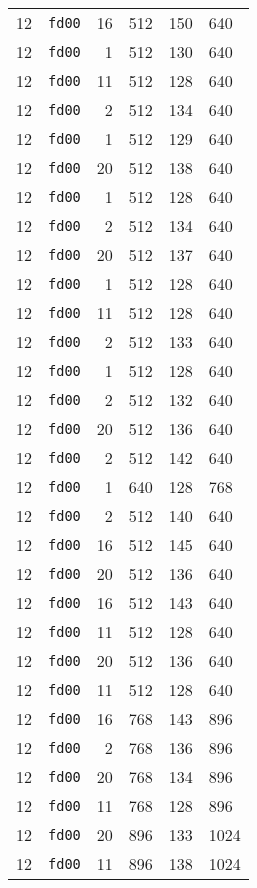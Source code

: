 \documentclass{article}
\begin{document}
\begin{table}[h!]
\begin{tabular}{llrrrl}
    12 & \texttt{fd00} & 16 & 512 & 150 & 640 \\
    12 & \texttt{fd00} & 1 & 512 & 130 & 640 \\
    12 & \texttt{fd00} & 11 & 512 & 128 & 640 \\
    12 & \texttt{fd00} & 2 & 512 & 134 & 640 \\
    12 & \texttt{fd00} & 1 & 512 & 129 & 640 \\
    12 & \texttt{fd00} & 20 & 512 & 138 & 640 \\
    12 & \texttt{fd00} & 1 & 512 & 128 & 640 \\
    12 & \texttt{fd00} & 2 & 512 & 134 & 640 \\
    12 & \texttt{fd00} & 20 & 512 & 137 & 640 \\
    12 & \texttt{fd00} & 1 & 512 & 128 & 640 \\
    12 & \texttt{fd00} & 11 & 512 & 128 & 640 \\
    12 & \texttt{fd00} & 2 & 512 & 133 & 640 \\
    12 & \texttt{fd00} & 1 & 512 & 128 & 640 \\
    12 & \texttt{fd00} & 2 & 512 & 132 & 640 \\
    12 & \texttt{fd00} & 20 & 512 & 136 & 640 \\
    12 & \texttt{fd00} & 2 & 512 & 142 & 640 \\
    12 & \texttt{fd00} & 1 & 640 & 128 & 768 \\
    12 & \texttt{fd00} & 2 & 512 & 140 & 640 \\
    12 & \texttt{fd00} & 16 & 512 & 145 & 640 \\
    12 & \texttt{fd00} & 20 & 512 & 136 & 640 \\
    12 & \texttt{fd00} & 16 & 512 & 143 & 640 \\
    12 & \texttt{fd00} & 11 & 512 & 128 & 640 \\
    12 & \texttt{fd00} & 20 & 512 & 136 & 640 \\
    12 & \texttt{fd00} & 11 & 512 & 128 & 640 \\
    12 & \texttt{fd00} & 16 & 768 & 143 & 896 \\
    12 & \texttt{fd00} & 2 & 768 & 136 & 896 \\
    12 & \texttt{fd00} & 20 & 768 & 134 & 896 \\
    12 & \texttt{fd00} & 11 & 768 & 128 & 896 \\
    12 & \texttt{fd00} & 20 & 896 & 133 & 1024 \\
    12 & \texttt{fd00} & 11 & 896 & 138 & 1024 \\

\end{tabular}
\end{table}
\end{document}
